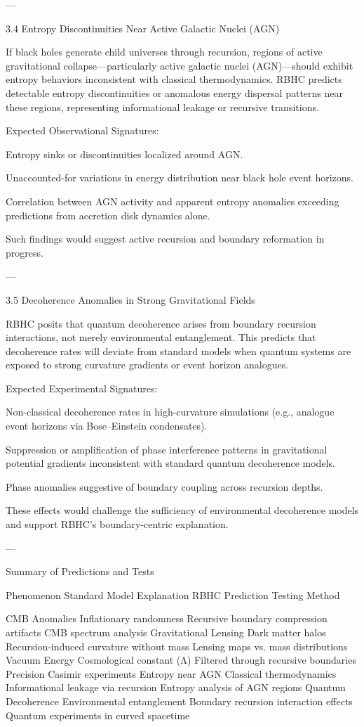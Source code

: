 \documentclass[11pt,a4paper]{article}
\begin{document}
---

3.4 Entropy Discontinuities Near Active Galactic Nuclei (AGN)

If black holes generate child universes through recursion, regions of active gravitational collapse—particularly active galactic nuclei (AGN)—should exhibit entropy behaviors inconsistent with classical thermodynamics. RBHC predicts detectable entropy discontinuities or anomalous energy dispersal patterns near these regions, representing informational leakage or recursive transitions.

Expected Observational Signatures:

Entropy sinks or discontinuities localized around AGN.

Unaccounted-for variations in energy distribution near black hole event horizons.

Correlation between AGN activity and apparent entropy anomalies exceeding predictions from accretion disk dynamics alone.


Such findings would suggest active recursion and boundary reformation in progress.


---

3.5 Decoherence Anomalies in Strong Gravitational Fields

RBHC posits that quantum decoherence arises from boundary recursion interactions, not merely environmental entanglement. This predicts that decoherence rates will deviate from standard models when quantum systems are exposed to strong curvature gradients or event horizon analogues.

Expected Experimental Signatures:

Non-classical decoherence rates in high-curvature simulations (e.g., analogue event horizons via Bose–Einstein condensates).

Suppression or amplification of phase interference patterns in gravitational potential gradients inconsistent with standard quantum decoherence models.

Phase anomalies suggestive of boundary coupling across recursion depths.


These effects would challenge the sufficiency of environmental decoherence models and support RBHC’s boundary-centric explanation.


---

Summary of Predictions and Tests

Phenomenon	Standard Model Explanation	RBHC Prediction	Testing Method

CMB Anomalies	Inflationary randomness	Recursive boundary compression artifacts	CMB spectrum analysis
Gravitational Lensing	Dark matter halos	Recursion-induced curvature without mass	Lensing maps vs. mass distributions
Vacuum Energy	Cosmological constant (Λ)	Filtered through recursive boundaries	Precision Casimir experiments
Entropy near AGN	Classical thermodynamics	Informational leakage via recursion	Entropy analysis of AGN regions
Quantum Decoherence	Environmental entanglement	Boundary recursion interaction effects	Quantum experiments in curved spacetime
\end{document}
